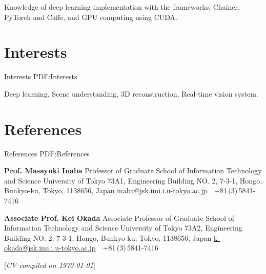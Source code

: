 \documentclass[letterpaper,MMMyyyy,nonstop]{simpleresumecv}
\newcommand{\CVNote}{CV compiled on {\today}}
\begin{document}
\begin{body}
\BulletItem
Knowledge of deep learning implementation with the frameworks, Chainer, PyTorch and Caffe,
and GPU computing using CUDA.

%
%


\section
{Interests}
{Interests}
{PDF:Interests}

Deep learning,
Scene understanding,
3D reconstruction,
Real-time vision system.


\section
{References}
{References}
{PDF:References}

\textbf{Prof. Masayuki Inaba}
\newline
Professor of Graduate School of Information Technology and Science
\newline
University of Tokyo
\newline
73A1, Engineering Building NO. 2, 7-3-1, Hongo, Bunkyo-ku, Tokyo, 1138656, Japan
\newline
\href{mailto:inaba@jsk.imi.i.u-tokyo.ac.jp}
{inaba@jsk.imi.i.u-tokyo.ac.jp}
\,\SubBulletSymbol\,
+81\,(3)\,5841-7416

\BigGapNoBreak

\textbf{Associate Prof. Kei Okada}
\newline
Associate Professor of Graduate School of Information Technology and Science
\newline
University of Tokyo
\newline
73A2, Engineering Building NO. 2, 7-3-1, Hongo, Bunkyo-ku, Tokyo, 1138656, Japan
\newline
\href{mailto:k-okada@jsk.imi.i.u-tokyo.ac.jp}
{k-okada@jsk.imi.i.u-tokyo.ac.jp}
\,\SubBulletSymbol\,
+81\,(3)\,5841-7416

\end{body}


\UseNoteFont%
\null\hfill%
[\textit{\CVNote}]%
\hspace{2.0mm}\null
\end{document}
